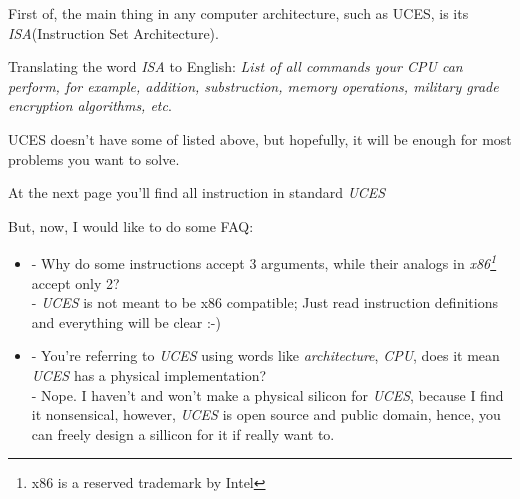 \documentclass{article}
\begin{document}
	First of, the main thing in any computer architecture, such as UCES, is its \textit{ISA}(Instruction Set Architecture).

	Translating the word \textit{ISA} to English: \textit{List of all commands your CPU can perform, for example, addition, substruction, memory operations, military grade encryption algorithms, etc}.

	UCES doesn't have some of listed above, but hopefully, it will be enough for most problems you want to solve. \newline

	At the next page you'll find all instruction in standard \textit{UCES}\newline

	But, now, I would like to do some FAQ:
	\begin{itemize}
		\item - Why do some instructions accept 3 arguments, while their analogs in \textit{x86\footnote{x86 is a reserved trademark by Intel}} accept only 2?\\
			- \textit{UCES} is not meant to be x86 compatible; Just read instruction definitions and everything will be clear :-)
		\item - You're referring to \textit{UCES} using words like \textit{architecture}, \textit{CPU}, does it mean \textit{UCES} has a physical implementation?\\
			- Nope. I haven't and won't make a physical silicon for \textit{UCES}, because I find it nonsensical, however, \textit{UCES} is open source and public domain, hence, you can freely design a sillicon for it if really want to.
	\end{itemize}
\end{document}
